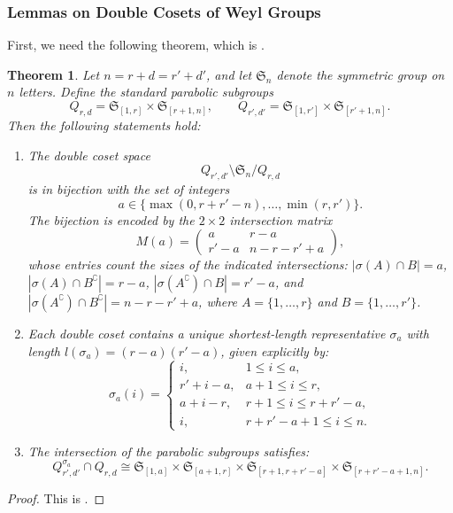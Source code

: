 \documentclass[12pt]{amsart}
\numberwithin{itemcounter}{subsection}
\theoremstyle{plain}
\newtheorem{theorem}{Theorem}[section]
\theoremstyle{definition}
\theoremstyle{remark}
\numberwithin{equation}{section}
\def\min{{\operatorname{min}\nolimits}}
\begin{document}
\subsubsection{Lemmas on Double Cosets of Weyl Groups}\label{prop:TypeA}
First, we need the following theorem, which is \cite[Theorem 1.3.10]{JK81}.
\begin{theorem}\label{Lem:james}
Let $n=r+d=r'+d'$, and let $\mathfrak{S}_n$ denote the symmetric group on $n$ letters. Define the standard parabolic subgroups
\[
Q_{r,d} = \mathfrak{S}_{[1,r]} \times \mathfrak{S}_{[r+1,n]}, \qquad
Q_{r',d'} = \mathfrak{S}_{[1,r']} \times \mathfrak{S}_{[r'+1,n]}.
\]
Then the following statements hold:
\begin{enumerate}
    \item The double coset space
    \[
    Q_{r', d'} \setminus \mathfrak{S}_n / Q_{r,d}
    \]
    is in bijection with the set of integers
    \[
    a \in \bigl\{ \max(0,r+r'-n),\dots,\min(r,r') \bigr\}.
    \]
    The bijection is encoded by the $2\times 2$ intersection matrix
    \[
    M(a) =
    \begin{pmatrix}
        a & r-a \\
        r'-a & n-r-r'+a
    \end{pmatrix},
    \]
    whose entries count the sizes of the indicated intersections:
    $|\sigma(A)\cap B|=a$,
    $|\sigma(A)\cap B^\complement|=r-a$,
    $|\sigma(A^\complement)\cap B|=r'-a$,
    and $|\sigma(A^\complement)\cap B^\complement|=n-r-r'+a$,
    where $A=\{1,\dots,r\}$ and $B=\{1,\dots,r'\}$.

    \item Each double coset contains a unique shortest-length representative $\sigma_a$ with length $l(\sigma_a) = (r-a)(r'-a)$, given explicitly by:
    \[
    \sigma_a(i) =
    \begin{cases}
        i, & 1\leq i\leq a, \\
        r' + i - a, & a+1\leq i\leq r, \\
        a + i - r, & r+1\leq i\leq r+r'-a, \\
        i, & r+r'-a+1\leq i\leq n.
    \end{cases}
    \]

    \item The intersection of the parabolic subgroups satisfies:
    \[
    Q_{r',d'}^{\sigma_a} \cap Q_{r,d} \cong \mathfrak{S}_{[1,a]} \times \mathfrak{S}_{[a+1,r]} \times \mathfrak{S}_{[r+1,r+r'-a]} \times \mathfrak{S}_{[r+r'-a+1,n]}.
    \]
\end{enumerate}
\end{theorem}
\begin{proof}
This is \cite[Theorem~1.3.10]{JK81}.
\end{proof}
\end{document}
